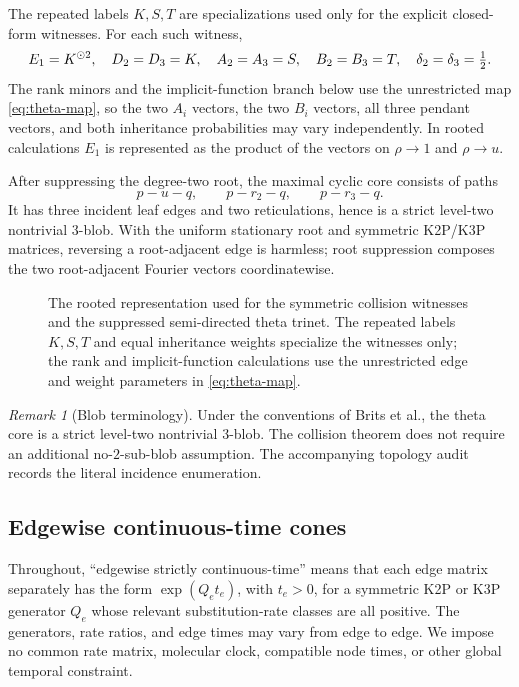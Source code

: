\documentclass[11pt]{article}
\theoremstyle{remark}\newtheorem{remark}[theorem]{Remark}
\begin{document}
The repeated labels $K,S,T$ are specializations used only for the explicit closed-form witnesses. For each such witness,
\[
E_1=K^{\mathbin{\odot}2},\quad D_2=D_3=K,\quad A_2=A_3=S,\quad B_2=B_3=T,
\quad\delta_2=\delta_3=\tfrac12.
\]
The rank minors and the implicit-function branch below use the unrestricted map \eqref{eq:theta-map}, so the two $A_i$ vectors, the two $B_i$ vectors, all three pendant vectors, and both inheritance probabilities may vary independently. In rooted calculations $E_1$ is represented as the product of the vectors on $\rho\to1$ and $\rho\to u$.

After suppressing the degree-two root, the maximal cyclic core consists of paths
\[
p-u-q,\qquad p-r_2-q,\qquad p-r_3-q.
\]
It has three incident leaf edges and two reticulations, hence is a strict level-two nontrivial $3$-blob. With the uniform stationary root and symmetric K2P/K3P matrices, reversing a root-adjacent edge is harmless; root suppression composes the two root-adjacent Fourier vectors coordinatewise.
\begin{figure}[ht]
\centering\resizebox{\textwidth}{!}{}
\caption{The rooted representation used for the symmetric collision witnesses and the suppressed semi-directed theta trinet. The repeated labels $K,S,T$ and equal inheritance weights specialize the witnesses only; the rank and implicit-function calculations use the unrestricted edge and weight parameters in \eqref{eq:theta-map}.}
\label{fig:theta}
\end{figure}
\begin{remark}[Blob terminology]
Under the conventions of Brits et al., the theta core is a strict level-two nontrivial $3$-blob. The collision theorem does not require an additional no-$2$-sub-blob assumption. The accompanying topology audit records the literal incidence enumeration.
\end{remark}

\subsection{Edgewise continuous-time cones}
Throughout, ``edgewise strictly continuous-time'' means that each edge matrix separately has the form $\exp(Q_e t_e)$, with $t_e>0$, for a symmetric K2P or K3P generator $Q_e$ whose relevant substitution-rate classes are all positive. The generators, rate ratios, and edge times may vary from edge to edge. We impose no common rate matrix, molecular clock, compatible node times, or other global temporal constraint.
\end{document}
